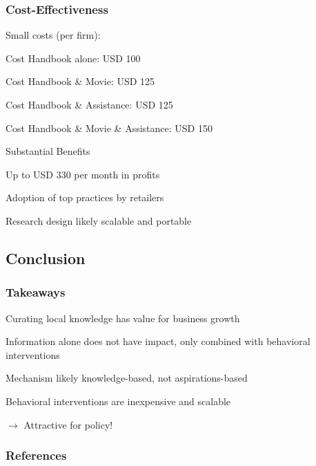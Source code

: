 \documentclass[hideothersubsections, usenames,dvipsnames,11pt]{beamer}
\newenvironment{itemize_3pt}{\itemize\addtolength{\itemsep}{3pt}}{\enditemize}
\begin{document}
\begin{frame}
\frametitle{Cost-Effectiveness}

\textcolor{bdf}{Small costs (per firm)}:
\begin{itemize_3pt}
\item Cost Handbook alone: USD 100
\item Cost Handbook \& Movie: USD 125
\item Cost Handbook \& Assistance: USD 125
\item Cost Handbook \& Movie \& Assistance: USD 150
\end{itemize_3pt}
\vspace{0.5em}

\textcolor{bdf}{Substantial Benefits}
\begin{itemize_3pt}
\item Up to USD 330 per month in profits
\item Adoption of top practices by retailers
\end{itemize_3pt}

\vspace{0.5em}
Research design likely \textcolor{bdf}{scalable and portable}

\end{frame}

\subsection{Conclusion}
\begin{frame}
\frametitle{Takeaways}
\begin{itemize_3pt}
    \item \textcolor{bdf}{Curating local knowledge has value for business growth} 
    \item Information alone does not have impact, only combined with \textcolor{bdf}{behavioral interventions}
    \item Mechanism likely \textcolor{bdf}{knowledge-based}, not aspirations-based
	\item Behavioral interventions are \textcolor{bdf}{inexpensive and scalable}
	\vspace{-0.5em}
	\item[] $\rightarrow$  Attractive for policy!
    
\end{itemize_3pt}
\end{frame}




\begin{frame}[allowframebreaks]
\frametitle{References}



\end{frame}
\end{document}
